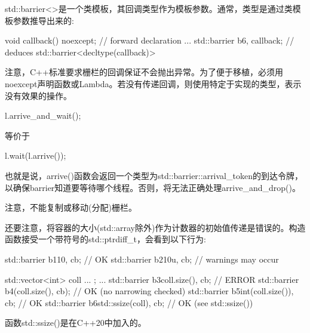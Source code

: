 std::barrier<>是一个类模板，其回调类型作为模板参数。通常，类型是通过类模板参数推导出来的:

\begin{cpp}
void callback() noexcept; // forward declaration
...
std::barrier b{6, callback}; // deduces std::barrier<decltype(callback)>
\end{cpp}

注意，C++标准要求栅栏的回调保证不会抛出异常。为了便于移植，必须用noexcept声明函数或Lambda。若没有传递回调，则使用特定于实现的类型，表示没有效果的操作。

\begin{cpp}
l.arrive_and_wait();
\end{cpp}

等价于

\begin{cpp}
l.wait(l.arrive());
\end{cpp}

也就是说，arrive()函数会返回一个类型为std::barrier::arrival\_token的到达令牌，以确保barrier知道要等待哪个线程。否则，将无法正确处理arrive\_and\_drop()。

注意，不能复制或移动(分配)栅栏。

还要注意，将容器的大小(std::array除外)作为计数器的初始值传递是错误的。构造函数接受一个带符号的std::ptrdiff\_t，会看到以下行为:

\begin{cpp}
std::barrier b1{10, cb}; // OK
std::barrier b2{10u, cb}; // warnings may occur

std::vector<int> coll{ ... };
...
std::barrier b3{coll.size(), cb}; // ERROR
std::barrier b4(coll.size(), cb); // OK (no narrowing checked)
std::barrier b5{int(coll.size()), cb}; // OK
std::barrier b6{std::ssize(coll), cb}; // OK (see std::ssize())
\end{cpp}

函数std::ssize()是在C++20中加入的。




